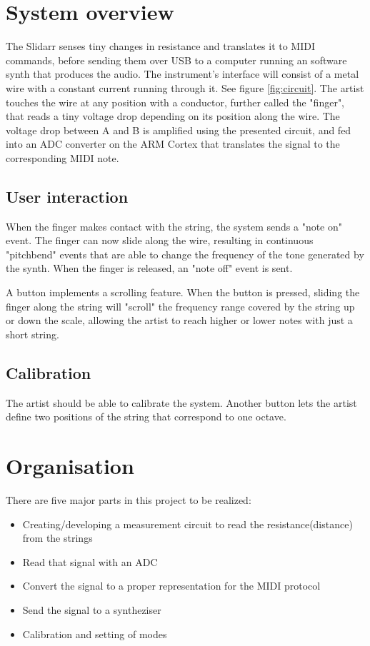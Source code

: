 \documentclass{article}
\begin{document}
\section{System overview}
The Slidarr senses tiny changes in resistance and translates it to MIDI commands, before sending them over USB to a computer running an software synth that produces the audio. The instrument's interface will consist of a metal wire with a constant current running through it. See figure \ref{fig:circuit}. The artist touches the wire at any position with a conductor, further called the "finger", that reads a tiny voltage drop depending on its position along the wire. The voltage drop between A and B is amplified using the presented circuit, and fed into an ADC converter on the ARM Cortex that translates the signal to the corresponding MIDI note. 

\subsection{User interaction}

When the finger makes contact with the string, the system sends a "note on" event. The finger can now slide along the wire, resulting in continuous "pitchbend" events that are able to change the frequency of the tone generated by the synth. When the finger is released, an "note off" event is sent.

A button implements a scrolling feature. When the button is pressed, sliding the finger along the string will "scroll" the frequency range covered by the string up or down the scale, allowing the artist to reach higher or lower notes with just a short string.

\subsection{Calibration}
The artist should be able to calibrate the system. Another button lets the artist define two positions of the string that correspond to one octave.

\section{Organisation}

There are five major parts in this project to be realized:
\begin{itemize}
    \item Creating/developing a measurement circuit to read the resistance(distance) from the strings
    \item Read that signal with an ADC
    \item Convert the signal to a proper representation for the MIDI protocol
    \item Send the signal to a syntheziser
    \item Calibration and setting of modes
\end{itemize}
\end{document}
